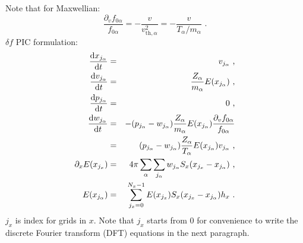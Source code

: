 \documentclass[12pt]{article}
\begin{document}
Note that for Maxwellian:
\begin{equation}
	\frac{\partial_v f_{0 \alpha}}{f_{0 \alpha}} = - \frac{v}{v_{\mathrm{th}, \alpha}^2} = - \frac{v}{T_\alpha / m_\alpha} \textrm{ .}
\end{equation}
$\delta f$ PIC formulation:
\begin{eqnarray}
	\frac{\mathrm{d} x_{j_\alpha}}{\mathrm{d} t} & = & v_{j_\alpha} \textrm{ ,} \label{eq:particle_evolution_begin} \\
	\frac{\mathrm{d} v_{j_\alpha}}{\mathrm{d} t} & = & \frac{Z_\alpha}{m_\alpha} E(x_{j_\alpha}) \textrm{ ,} \\
	\frac{\mathrm{d} p_{j_\alpha}}{\mathrm{d} t} & = & 0 \textrm{ ,} \\
	\frac{\mathrm{d} w_{j_\alpha}}{\mathrm{d} t} & = & - (p_{j_\alpha} - w_{j_\alpha}) \frac{Z_\alpha}{m_\alpha} E(x_{j_\alpha}) \frac{\partial_v f_{0 \alpha}}{f_{0 \alpha}} \nonumber \\
	& = & (p_{j_\alpha} - w_{j_\alpha}) \frac{Z_\alpha}{T_\alpha} E(x_{j_\alpha}) v_{j_\alpha} \textrm{ ,} \label{eq:particle_evolution_end} \\
	\partial_x E(x_{j_x}) & = & 4 \pi \sum_\alpha \sum_{j_\alpha} w_{j_\alpha} S_x(x_{j_x} - x_{j_\alpha}) \textrm{ ,} \label{eq:poisson_df_pic} \\
	E(x_{j_\alpha}) & = & \sum_{j_x = 0}^{N_x - 1} E(x_{j_x}) S_x(x_{j_x} - x_{j_\alpha}) h_x \textrm{ .} \label{eq:field_scatter}
\end{eqnarray}
$j_x$ is index for grids in $x$.
Note that $j_x$ starts from $0$ for convenience to write the discrete Fourier transform (DFT) equations in the next paragraph.
\end{document}
